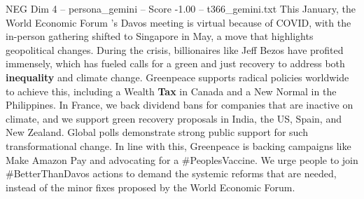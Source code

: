 \begin{textsample}{NEG Dim 4 – persona\_gemini – Score -1.00 – t366\_gemini.txt}  \label{ex:f4_neg_008}
This January, the World Economic Forum 's Davos meeting is virtual because of COVID, with the in-person gathering shifted to Singapore in May, a move that highlights geopolitical changes.
During the crisis, billionaires like Jeff Bezos have profited immensely, which has fueled calls for a green and just recovery to address both \textbf{inequality} and climate change.
Greenpeace supports radical policies worldwide to achieve this, including a Wealth \textbf{Tax} in Canada and a New Normal in the Philippines.
In France, we back dividend bans for companies that are inactive on climate, and we support green recovery proposals in India, the US, Spain, and New Zealand.
Global polls demonstrate strong public support for such transformational change.
In line with this, Greenpeace is backing campaigns like Make Amazon Pay and advocating for a \#PeoplesVaccine.
We urge people to join \#BetterThanDavos actions to demand the systemic reforms that are needed, instead of the minor fixes proposed by the World Economic Forum.

\end{textsample}
